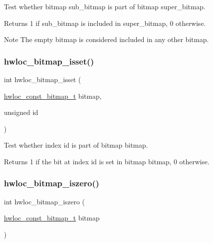 Test whether bitmap {\ttfamily sub\+\_\+bitmap} is part of bitmap {\ttfamily super\+\_\+bitmap}. 

\begin{DoxyReturn}{Returns}
1 if {\ttfamily sub\+\_\+bitmap} is included in {\ttfamily super\+\_\+bitmap}, 0 otherwise.
\end{DoxyReturn}
\begin{DoxyNote}{Note}
The empty bitmap is considered included in any other bitmap. 
\end{DoxyNote}
\mbox{\label{a00205_ga11340dd487f110bb84f0a6e4ae90bd06}} 
\subsubsection{\texorpdfstring{hwloc\+\_\+bitmap\+\_\+isset()}{hwloc\_bitmap\_isset()}}
{\footnotesize\ttfamily int hwloc\+\_\+bitmap\+\_\+isset (\begin{DoxyParamCaption}\item[{\hyperlink{a00205_gae991a108af01d408be2776c5b2c467b2}{hwloc\+\_\+const\+\_\+bitmap\+\_\+t}}]{bitmap,  }\item[{unsigned}]{id }\end{DoxyParamCaption})}



Test whether index {\ttfamily id} is part of bitmap {\ttfamily bitmap}. 

\begin{DoxyReturn}{Returns}
1 if the bit at index {\ttfamily id} is set in bitmap {\ttfamily bitmap}, 0 otherwise. 
\end{DoxyReturn}
\mbox{\label{a00205_ga5b64be28f5a7176ed8ad0d6a90bdf108}} 
\subsubsection{\texorpdfstring{hwloc\+\_\+bitmap\+\_\+iszero()}{hwloc\_bitmap\_iszero()}}
{\footnotesize\ttfamily int hwloc\+\_\+bitmap\+\_\+iszero (\begin{DoxyParamCaption}\item[{\hyperlink{a00205_gae991a108af01d408be2776c5b2c467b2}{hwloc\+\_\+const\+\_\+bitmap\+\_\+t}}]{bitmap }\end{DoxyParamCaption})}



